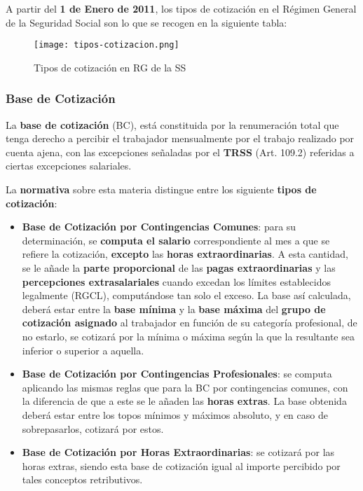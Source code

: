 A partir del \textbf{1 de Enero de 2011}, los tipos de cotización en el Régimen General de la Seguridad Social son lo que se recogen en la siguiente tabla:

\begin{figure}[H]
    \centering
    \texttt{[image: tipos-cotizacion.png]}
    \caption{Tipos de cotización en RG de la SS}
\end{figure}

\subsubsection{Base de Cotización}
La \textbf{base de cotización} (BC), está constituida por la renumeración total que tenga derecho a percibir el trabajador mensualmente por el trabajo realizado por cuenta ajena, con las excepciones señaladas por el \textbf{TRSS} (Art. 109.2) referidas a ciertas excepciones salariales.

La \textbf{normativa} sobre esta materia distingue entre los siguiente \textbf{tipos de cotización}:

\begin{itemize}
    \item \textbf{Base de Cotización por Contingencias Comunes}: para su determinación, se \textbf{computa el salario} correspondiente al mes a que se refiere la cotización, \textbf{excepto} las \textbf{horas extraordinarias}. A esta cantidad, se le añade la \textbf{parte proporcional} de las \textbf{pagas extraordinarias} y las \textbf{percepciones extrasalariales} cuando excedan los límites establecidos legalmente (RGCL), computándose tan solo el exceso. La base así calculada, deberá estar entre la \textbf{base mínima} y la \textbf{base máxima} del \textbf{grupo de cotización asignado} al trabajador en función de su categoría profesional, de no estarlo, se cotizará por la mínima o máxima según la que la resultante sea inferior o superior a aquella.

    \item \textbf{Base de Cotización por Contingencias Profesionales}: se computa aplicando las mismas reglas que para la BC por contingencias comunes, con la diferencia de que a este se le añaden las \textbf{horas extras}. La base obtenida deberá estar entre los topos mínimos y máximos absoluto, y en caso de sobrepasarlos, cotizará por estos.

    \item \textbf{Base de Cotización por Horas Extraordinarias}: se cotizará por las horas extras, siendo esta base de cotización igual al importe percibido por tales conceptos retributivos.
\end{itemize}


